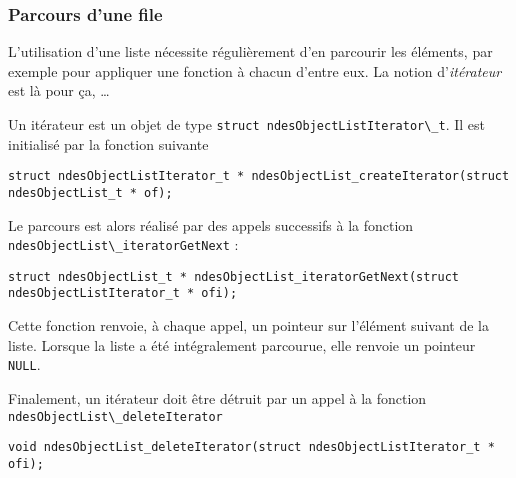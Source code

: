 %
\subsubsection{Parcours d'une file}

   L'utilisation d'une liste nécessite régulièrement d'en parcourir
les éléments, par exemple pour appliquer une fonction à chacun d'entre
eux. La notion d'{\em itérateur} est là pour ça, \ldots

   Un itérateur est un objet de type \lstinline{struct ndesObjectListIterator\_t}.
 Il est initialisé par la fonction
suivante 

\begin{verbatim}
struct ndesObjectListIterator_t * ndesObjectList_createIterator(struct
ndesObjectList_t * of);
\end{verbatim}

   Le parcours est alors réalisé par des appels successifs à la
fonction \lstinline{ndesObjectList\_iteratorGetNext} :

\begin{verbatim}
struct ndesObjectList_t * ndesObjectList_iteratorGetNext(struct ndesObjectListIterator_t * ofi);
\end{verbatim}

   Cette fonction renvoie, à chaque appel, un pointeur sur l'élément
suivant de la liste. Lorsque la liste a été intégralement parcourue,
elle renvoie un pointeur {\tt NULL}.

   Finalement, un itérateur doit être détruit par un appel à la
fonction \lstinline{ndesObjectList\_deleteIterator}

\begin{verbatim}
void ndesObjectList_deleteIterator(struct ndesObjectListIterator_t * ofi);
\end{verbatim}
